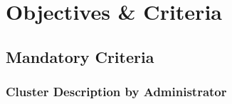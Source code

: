\documentclass[a4paper, 11pt]{article}
\let\oldsection\section
\renewcommand\section{\clearpage\oldsection}
\begin{document}
\section{Objectives \& Criteria}
\subsection{Mandatory Criteria}\label{MandatoryCriteria}

\subsubsection{Cluster Description by Administrator}
\end{document}
